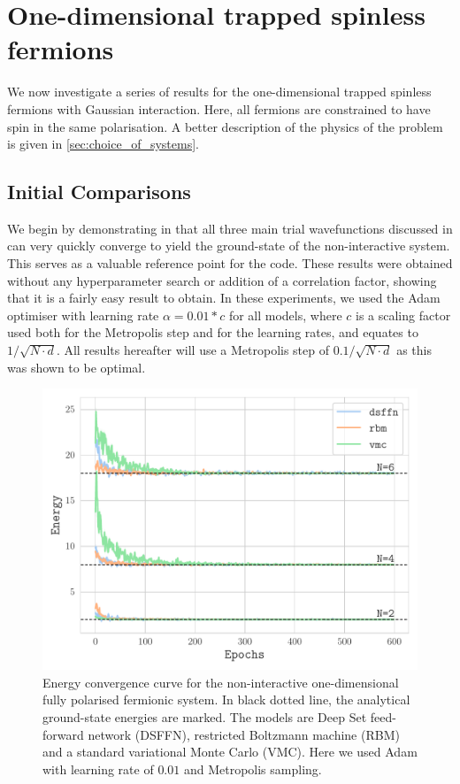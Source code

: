 \chapter{One-dimensional trapped spinless fermions}\label{ch:fermion_1d}

We now investigate a series of results for the one-dimensional trapped spinless fermions with Gaussian interaction. Here, all fermions are constrained to have spin in the same polarisation. A better description of the physics of the problem is given in \ref{sec:choice_of_systems}.

\section{Initial Comparisons}

We begin by demonstrating in  that all three main trial wavefunctions discussed in  can very quickly converge to yield the ground-state of the non-interactive system. This serves as a valuable reference point for the code. These results were obtained without any hyperparameter search or addition of a correlation factor, showing that it is a fairly easy result to obtain. In these experiments, we used the Adam optimiser with learning rate $\alpha = 0.01 * c$ for all models, where $c$ is a scaling factor used both for the Metropolis step and for the learning rates, and equates to $1/\sqrt{N\cdot d}$. All results hereafter will use a Metropolis step of $0.1/\sqrt{N\cdot d}$ as this was shown to be optimal.
\begin{figure}[H]
    \centering
    \includegraphics[width=0.55\linewidth]{Chapters/Results/N2/E_conv_ferm_pol_NI.pdf}
    \caption{Energy convergence curve for the non-interactive one-dimensional fully polarised fermionic system. In black dotted line, the analytical ground-state energies are marked. The models are Deep Set feed-forward network (DSFFN), restricted Boltzmann machine (RBM) and a standard variational Monte Carlo (VMC). Here we used Adam with learning rate of $0.01$ and Metropolis sampling.}
    \label{fig:E_conv_ferm_pol_NI}
\end{figure}

